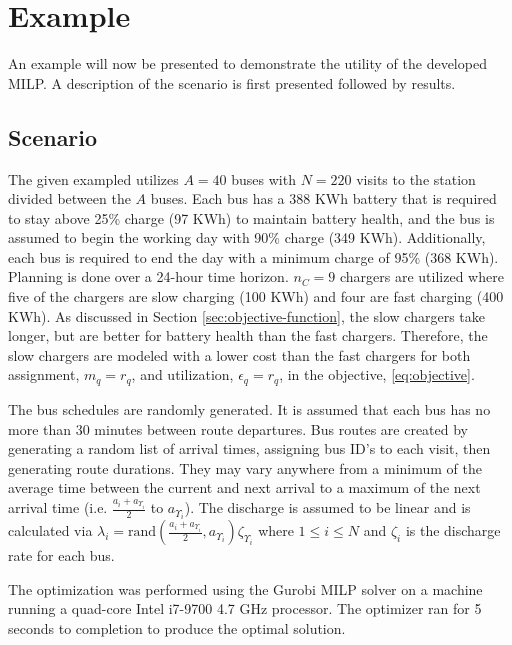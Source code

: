 \documentclass[letterpaper, 10pt, conference]{IEEEtran}
\begin{document}
\section{Example}
\label{sec:example}

An example will now be presented to demonstrate the utility of the developed MILP. A description of the scenario is
first presented followed by results.

\subsection{Scenario}
The given exampled utilizes $A = 40$ buses with $N = 220$ visits to the station divided between the $A$ buses. Each bus
has a 388 KWh battery that is required to stay above 25\% charge (97 KWh) to maintain battery health, and the bus is
assumed to begin the working day with 90\% charge (349 KWh). Additionally, each bus is required to end the day with a
minimum charge of 95\% (368 KWh). Planning is done over a 24-hour time horizon. $n_C = 9$ chargers are utilized where five
of the chargers are slow charging (100 KWh) and four are fast charging (400 KWh). As discussed in Section
\ref{sec:objective-function}, the slow chargers take longer, but are better for battery health than the fast chargers.
Therefore, the slow chargers are modeled with a lower cost than the fast chargers for both assignment, $m_q = r_q$, and
utilization, $\epsilon_q = r_q$, in the objective, \eqref{eq:objective}.

The bus schedules are randomly generated. It is assumed that each bus has no more than 30 minutes between route
departures. Bus routes are created by generating a random list of arrival times, assigning bus ID's to each visit, then
generating route durations. They may vary anywhere from a minimum of the average time between the current and next
arrival to a maximum of the next arrival time (i.e. $\frac{a_i + a_{\Upsilon_i}}{2}$ to $a_{\Upsilon_i}$). The discharge is assumed to
be linear and is calculated via $\lambda_i = \text{rand}(\frac{a_i + a_{\Upsilon_i}}{2},a_{\Upsilon_i})\zeta_{\Upsilon_i}$ where $1 \leq i \leq N$ and $\zeta_i$
is the discharge rate for each bus.

The optimization was performed using the Gurobi MILP solver \cite{Hespanha2018} on a machine running a quad-core Intel
i7-9700 4.7 GHz processor. The optimizer ran for 5 seconds to completion to produce the optimal solution.
\end{document}
